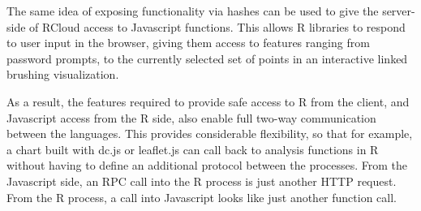 The same idea of exposing functionality via hashes can be used to give
the server-side of RCloud access to Javascript functions. This allows
R libraries to respond to user input in the browser, giving them
access to features ranging from password prompts, to the currently
selected set of points in an interactive linked brushing
visualization.

As a result, the features required to provide safe access to R from
the client, and Javascript access from the R side, also enable
full two-way communication between the languages.  This provides
considerable flexibility, so that for example, a chart built with dc.js
or leaflet.js can call back to analysis functions in R without having
to define an additional protocol between the processes. From the
Javascript side, an RPC call into the R process is just another HTTP
request. From the R process, a call into Javascript looks like just
another function call.
